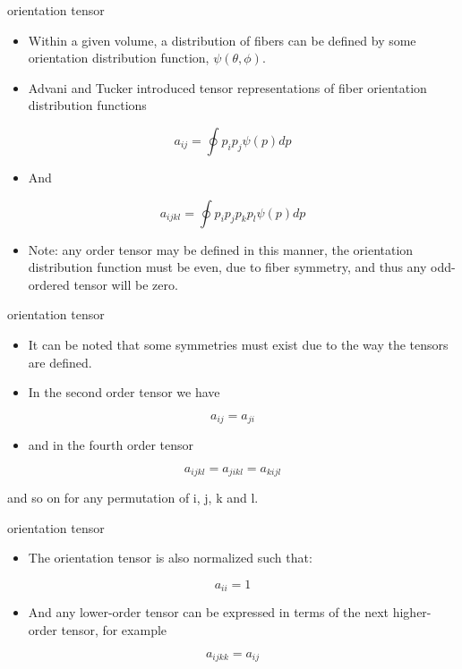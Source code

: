 \documentclass[
  letterpaper,
  ignorenonframetext,
  aspectratio=43,
  handout,
  12pt]{beamer}
\providecommand{\tightlist}{%
  \setlength{\itemsep}{0pt}\setlength{\parskip}{0pt}}
\providecommand{\tightlist}{%
\setlength{\itemsep}{0pt}\setlength{\parskip}{0pt}}
\begin{document}
\begin{frame}{orientation tensor}
\protect\hypertarget{orientation-tensor}{}
\begin{itemize}
\tightlist
\item
  Within a given volume, a distribution of fibers can be defined by some
  orientation distribution function, \(\psi(\theta, \phi)\).
\item
  Advani and Tucker introduced tensor representations of fiber
  orientation distribution functions
\end{itemize}

\[a_{ij} = \oint p_i p_j \psi(p) dp\]

\begin{itemize}
\tightlist
\item
  And
\end{itemize}

\[a_{ijkl} = \oint p_i p_j p_k p_l\psi(p) dp\]

\begin{itemize}
\tightlist
\item
  Note: any order tensor may be defined in this manner, the orientation
  distribution function must be even, due to fiber symmetry, and thus
  any odd-ordered tensor will be zero.
\end{itemize}
\end{frame}

\begin{frame}{orientation tensor}
\protect\hypertarget{orientation-tensor-1}{}
\begin{itemize}
\tightlist
\item
  It can be noted that some symmetries must exist due to the way the
  tensors are defined.
\item
  In the second order tensor we have
\end{itemize}

\[a_{ij} = a_{ji}\]

\begin{itemize}
\tightlist
\item
  and in the fourth order tensor
\end{itemize}

\[a_{ijkl} = a_{jikl} = a_{kijl}\]

and so on for any permutation of i, j, k and l.
\end{frame}

\begin{frame}{orientation tensor}
\protect\hypertarget{orientation-tensor-2}{}
\begin{itemize}
\tightlist
\item
  The orientation tensor is also normalized such that:
\end{itemize}

\[a_{ii} = 1\]

\begin{itemize}
\tightlist
\item
  And any lower-order tensor can be expressed in terms of the next
  higher-order tensor, for example
\end{itemize}

\[a_{ijkk} = a_{ij}\]
\end{frame}
\end{document}
